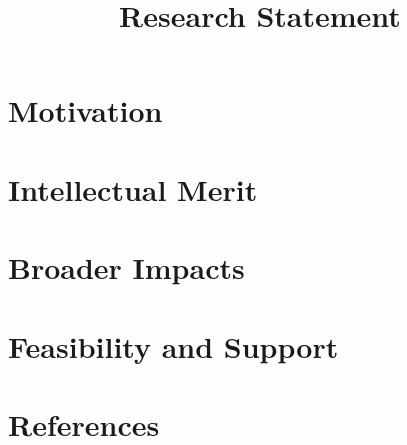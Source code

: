 \documentclass{grfp}
\begin{document}
\title{Research Statement}
\newcommand{\nsftitle}[1]{\centerline{\nsfhdr{#1}}}
\section*{Motivation}
\lipsum[63]
\lipsum[63]
\section*{Intellectual Merit}
\lipsum[63]
\lipsum[63]
\section*{Broader Impacts}
\lipsum[63]
\lipsum[63]
\section*{Feasibility and Support}{
\lipsum[63]
\lipsum[63]
}
\section*{References}{

}
\end{document}
